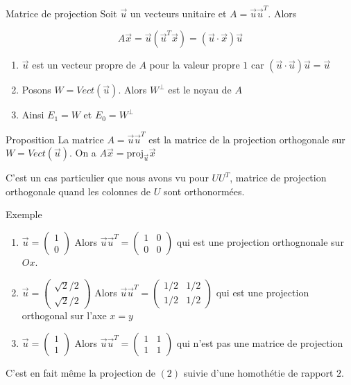 \begin{parag}{Matrice de projection}
    Soit $\vec{u}$ un vecteurs unitaire et $A = \vec{u}\vec{u}^T$. Alors
    \begin{formule}
        \[A\vec{x} = \vec{u}(\vec{u}^T\vec{x}) = (\vec{u}\cdot\vec{x})\vec{u}\]
    \end{formule}
    \begin{enumerate}
        \item $\vec{u}$ est un vecteur propre de $A$ pour la valeur propre $1$ car $(\vec{u}\cdot\vec{u})\vec{u} = \vec{u}$
        \item Posons $W = Vect(\vec{u})$. Alors $W^\perp$ est le noyau de $A$
        \item Ainsi $E_1 = W$ et $E_0 = W^\perp$
    \end{enumerate}
    \begin{subparag}{Proposition}
        La matrice $A = \vec{u}\vec{u}^T$ est la matrice de la projection orthogonale sur $W = Vect(\vec{u}).$ On a $A\vec{x} = \text{proj}_\vec{u}\vec{x}$
    \end{subparag}
    C'est un cas particulier que nous avons vu pour $UU^T$, matrice de projection orthogonale quand les colonnes de $U$ sont orthonormées.
    \begin{subparag}{Exemple}
        \begin{enumerate}
            \item $\vec{u} = \begin{pmatrix}
                1 \\ 0
            \end{pmatrix}$ Alors $\vec{u}\vec{u}^T = \begin{pmatrix}
                1 & 0 \\ 0 & 0
            \end{pmatrix}$ qui est une projection orthognonale sur $Ox$.
            \item $\vec{u} = \begin{pmatrix}
                \sqrt{2}/2\\ \sqrt{2}/2
            \end{pmatrix}$ Alors $\vec{u}\vec{u}^T = \begin{pmatrix}
                1/2 & 1/2\\ 1/2 & 1/2
            \end{pmatrix}$ qui est une projection orthogonal sur l'axe $x = y$
            \item $\vec{u} = \begin{pmatrix}
                1 \\ 1
            \end{pmatrix}$ Alors $\vec{u}\vec{u}^T = \begin{pmatrix}
                1 & 1\\ 1 & 1
            \end{pmatrix}$ qui n'est pas une matrice de projection
        \end{enumerate}
        C'est en fait même la projection de $(2)$ suivie d'une homothétie de rapport $2$.
    \end{subparag}
\end{parag}

